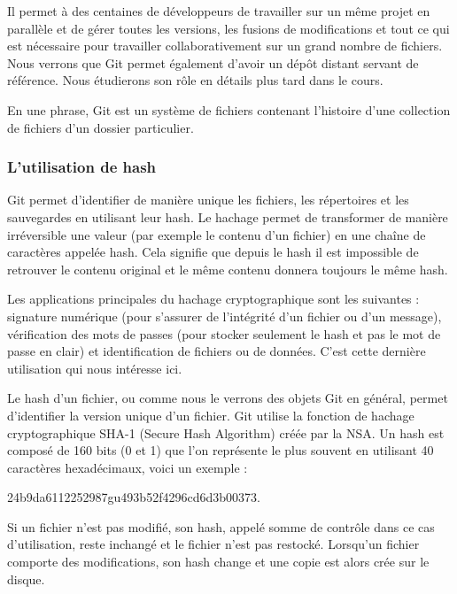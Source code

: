 \documentclass{article}
\begin{document}
Il permet à des centaines de développeurs de travailler sur un même projet en parallèle et de gérer toutes les versions, les fusions de modifications et tout ce qui est nécessaire pour travailler collaborativement sur un grand nombre de fichiers. Nous verrons que {\color{blue}Git} permet également d'avoir un dépôt distant servant de référence. Nous étudierons son rôle en détails plus tard dans le cours.

En une phrase, {\color{blue}Git} est un système de fichiers contenant l'histoire d'une collection de fichiers d'un dossier particulier.

\subsubsection{L'utilisation de {\color{blue}hash}}
{\color{blue}Git} permet d'identifier de manière unique les fichiers, les répertoires et les sauvegardes en utilisant leur {\color{blue}hash}. Le hachage permet de transformer de manière irréversible une valeur (par exemple le contenu d'un fichier) en une chaîne de caractères appelée {\color{blue}hash}. Cela signifie que depuis le {\color{blue}hash} il est impossible de retrouver le contenu original et le même contenu donnera toujours le même {\color{blue}hash}.

Les applications principales du hachage cryptographique sont les suivantes : signature numérique (pour s'assurer de l'intégrité d'un fichier ou d'un message), vérification des mots de passes (pour stocker seulement le {\color{blue}hash} et pas le mot de passe en clair) et identification de fichiers ou de données. C'est cette dernière utilisation qui nous intéresse ici.

Le {\color{blue}hash} d'un fichier, ou comme nous le verrons des objets {\color{blue}Git} en général, permet d'identifier la version unique d'un fichier. {\color{blue}Git} utilise la fonction de hachage cryptographique {\color{blue}SHA-1 (Secure Hash Algorithm)} créée par la {\color{blue}NSA}. Un {\color{blue}hash} est composé de 160 {\color{blue}bits} (0 et 1) que l'on représente le plus souvent en utilisant 40 caractères hexadécimaux, voici un exemple :
\begin{center}
{\color{blue}24b9da6112252987gu493b52f4296cd6d3b00373}.
\end{center}

Si un fichier n'est pas modifié, son hash, appelé somme de contrôle dans ce cas d'utilisation, reste inchangé et le fichier n'est pas restocké. Lorsqu'un fichier comporte des modifications, son hash change et une copie est alors crée sur le disque.
\end{document}
